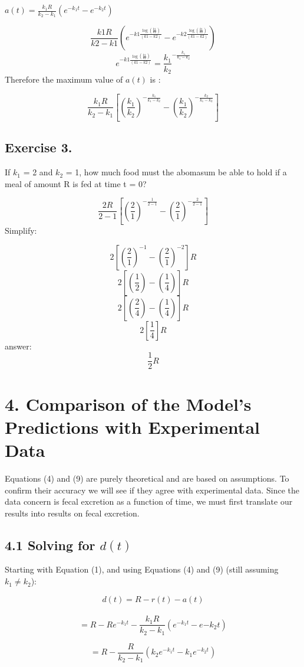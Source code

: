 \documentclass[]{article}
\begin{document}
\(a(t) = \frac{k_1R}{k_2-k_1}(e^{-k_1t}-e^{-k_2t})\)

\[\frac{k1 R}{k2 - k1}(e^{-k1 \frac{\log{(\frac{k1}{k2})}}{(k1 - k2)}}-e^{-k2 \frac{\log{(\frac{k1}{k2})}}{(k1 - k2)}})\]
\[e^{-k1 \frac{\log{(\frac{k1}{k2})}}{(k1 - k2)}}=\frac{k_1}{k_2}^{-\frac{k_1}{k_1 - k_2}}\]
Therefore the maximum value of \(a(t)\) is :

\[\frac{k_1R}{k_2-k_1}[(\frac{k_1}{k_2})^{-\frac{k_1}{k_1-k_2}}-(\frac{k_1}{k_2})^{-\frac{k_2}{k_1-k_2}}]\]

\subsection{Exercise 3.}\label{exercise-3.}

If \(k_1\) = 2 and \(k_2\) = 1, how much food must the abomasum be able
to hold if a meal of amount R is fed at time t = 0?

\[\frac{2 R}{2 - 1}[(\frac{2}{1})^{-\frac{1}{2-1}}-(\frac{2}{1})^{-\frac{2}{2-1}}]\]
Simplify:

\[2[(\frac{2}{1})^{-1}-(\frac{2}{1})^{-2}]R\]
\[2[(\frac{1}{2})-(\frac{1}{4})]R\] \[2[(\frac{2}{4})-(\frac{1}{4})]R\]
\[2[\frac{1}{4}]R\] answer: \[\frac{1}{2}R\]

\section{4. Comparison of the Model's Predictions with Experimental
Data}\label{comparison-of-the-models-predictions-with-experimental-data}

Equations (4) and (9) are purely theoretical and are based on
assumptions. To confirm their accuracy we will see if they agree with
experimental data. Since the data concern is fecal excretion as a
function of time, we must first translate our results into results on
fecal excretion.

\subsection{\texorpdfstring{4.1 Solving for
\(d(t)\)}{4.1 Solving for d(t)}}\label{solving-for-dt}

Starting with Equation (1), and using Equations (4) and (9) (still
assuming \(k_1 \neq k_2\)):

\[d(t) = R - r(t) - a(t)\]\\
\[= R - Re^{-k_1t} - \frac{k_1R}{k_2 - k_1} (e^{-k_1t}-e{-k_2t})\]

\[= R - \frac{R}{k_2-k_1}(k_2e^{-k_1t} - k_1e^{-k_2t})\]
\end{document}
